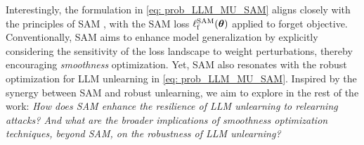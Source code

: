 Interestingly, the formulation in \eqref{eq: prob_LLM_MU_SAM} aligns closely with the principles of SAM \citep{foret2021sharpnessaware}, with the SAM loss $\ell^{\mathrm{SAM}}_{\mathrm{f}} ({\boldsymbol{\theta}})$ applied to forget objective.
%
%
%
Conventionally, SAM aims to enhance model generalization by explicitly considering the sensitivity of the loss landscape to weight perturbations, thereby encouraging \textit{smoothness} optimization. Yet,  SAM also resonates with the robust optimization for LLM unlearning in \eqref{eq: prob_LLM_MU_SAM}.
Inspired by the synergy between SAM and robust unlearning, we aim to explore in the rest of the work:
\textit{How does SAM enhance the resilience of LLM unlearning to relearning attacks?
And what are the broader implications of smoothness optimization techniques, beyond SAM, on the robustness of LLM unlearning?}




 


